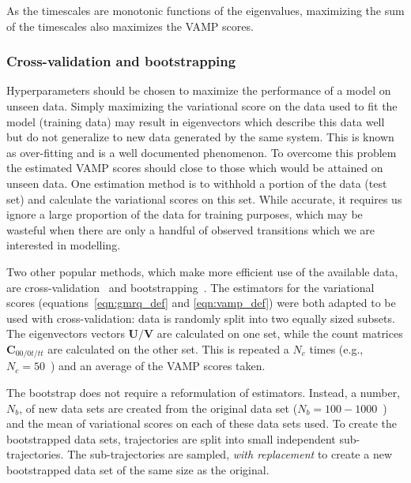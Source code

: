 \documentclass[journal=jacsat,manuscript=article]{achemso}
\begin{document}
As the timescales are monotonic functions of the eigenvalues, maximizing the sum of the timescales also maximizes the VAMP scores. 

\subsubsection{Cross-validation and bootstrapping}

Hyperparameters should be chosen to maximize the performance of a model on unseen data. Simply maximizing the variational score on the data used to fit the model (training data) may result in eigenvectors which describe this data well but do not generalize to new data generated by the same system. This is known as over-fitting and is a well documented phenomenon\cite{friedman2001elements}. To overcome this problem the estimated VAMP scores should close to those which would be attained on unseen data. One estimation method is to withhold a portion of the data (test set) and calculate the variational scores on this set. While accurate, it requires us ignore a large proportion of the data for training purposes, which may be wasteful when there are only a handful of observed transitions which we are interested in modelling. 

Two other popular methods, which make more efficient use of the available data,  are cross-validation~\cite{arlotSurveyCrossvalidationProcedures2009} and bootstrapping~\cite{efronIntroductionBootstrap1993}. The estimators for the variational scores (equations~\ref{eqn:gmrq_def} and \ref{eqn:vamp_def}) were both adapted to be used with cross-validation\cite{wuVariationalApproachLearning2020c, mcgibbonVariationalCrossvalidationSlow2015}: data is randomly split into two equally sized subsets. The eigenvectors vectors $\mathbf{U}/\mathbf{V}$ are calculated on one set, while the count matrices $\mathbf{C}_{00/0t/tt}$ are calculated on the other set.  This is repeated a $N_c$ times (e.g., $N_c =50$~\cite{scherer_variational_2019}) and an average of the VAMP scores taken.

The bootstrap does not require a reformulation of estimators. Instead, a number, $N_b$, of new data sets are created from the original data set ($N_b = 100 - 1000$~\cite{efronIntroductionBootstrap1993}) and the mean of variational scores on each of these data sets used. To create the bootstrapped data sets, 
trajectories are split into small independent sub-trajectories. The sub-trajectories are sampled, \emph{with replacement} to create a new bootstrapped data set of the same size as the original. 
\end{document}
